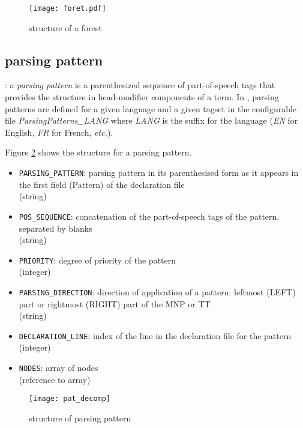 \begin{center}
 \begin{figure}[!htbp]
 \begin{center}
 \texttt{[image: foret.pdf]}
 \caption{structure of a forest }\label{Fig:fforest}
 \end{center}
 \end{figure}
 \end{center}


\subsection{parsing pattern}\label{pattern}
\begin{definition}
: a \emph{parsing pattern} is a parenthesized sequence of part-of-speech tags that
provides the structure in head-modifier components of a term. In
\YaTeA, parsing patterns are defined for a given language and a given
tagset in the configurable file \emph{ParsingPatterns\_LANG} where
\emph{LANG} is the suffix for the language (\emph{EN} for English, \emph{FR} for French, \textit{etc.}).
\end{definition}
Figure \ref{pat} shows the structure for a parsing pattern.
\begin{itemize}
\item \texttt{PARSING\_PATTERN}: parsing pattern in its parenthesised
  form as it appears in the first field (Pattern) of the declaration file\\(string)
\item \texttt{POS\_SEQUENCE}: concatenation of the part-of-speech tags of the pattern, separated by blanks\\(string)
\item \texttt{PRIORITY}: degree of priority of the pattern\\ (integer)
\item \texttt{PARSING\_DIRECTION}: direction of application of a
  pattern: leftmost (LEFT) part or rightmost (RIGHT) part of the MNP or
  TT\\(string)
\item \texttt{DECLARATION\_LINE}: index of the line in the declaration file for the pattern\\ (integer)
\item \texttt{NODES}: array of nodes\\ (reference to array)
\end{itemize}
\begin{center}
\begin{figure}[!htbp]
\begin{center}
\texttt{[image: pat\_decomp]}
\caption{structure of parsing pattern }\label{pat}
\end{center}
\end{figure}
\end{center}

